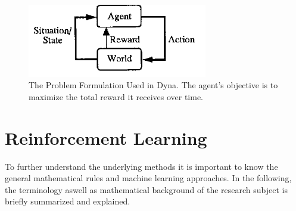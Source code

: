 \documentclass[a4paper]{article}
\begin{document}
	
	\begin{figure}[b]
		\centering
		\includegraphics[angle=0,width=0.7\textwidth]{./figs/Dyna-Figure1.png}
		\caption{\label{fig:dyna}The Problem Formulation Used in Dyna. The agent's objective is to maximize the total reward it receives over time. \citep{Dyna}}
	\end{figure}
	\newpage
	\section{Reinforcement Learning}
	To further understand the underlying methods it is important to know the general mathematical rules and machine learning approaches. In the following, the terminology aswell as mathematical background of the research subject is briefly summarized and explained. 
	
\end{document}
